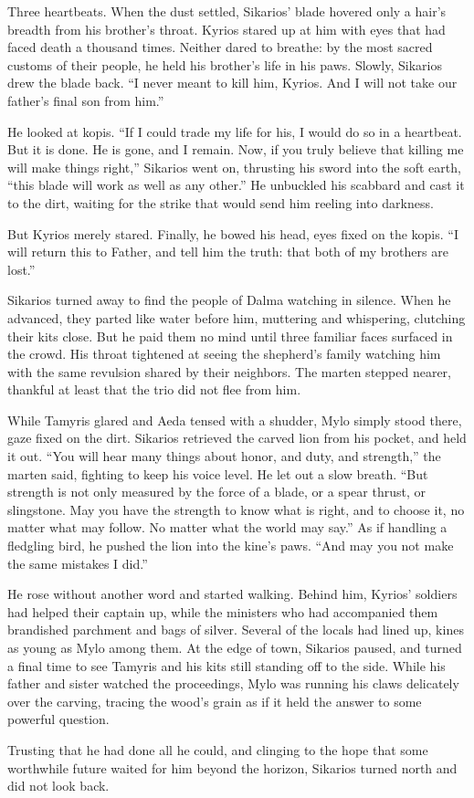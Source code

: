 Three heartbeats. When the dust settled, Sikarios' blade hovered only a hair's breadth from his brother's throat. Kyrios stared up at him with eyes that had faced death a thousand times. Neither dared to breathe: by the most sacred customs of their people, he held his brother's life in his paws. Slowly, Sikarios drew the blade back. ``I never meant to kill him, Kyrios. And I will not take our father's final son from him.''

He looked at kopis. ``If I could trade my life for his, I would do so in a heartbeat. But it is done. He is gone, and I remain. Now, if you truly believe that killing me will make things right,'' Sikarios went on, thrusting his sword into the soft earth, ``this blade will work as well as any other.'' He unbuckled his scabbard and cast it to the dirt, waiting for the strike that would send him reeling into darkness.

But Kyrios merely stared. Finally, he bowed his head, eyes fixed on the kopis. ``I will return this to Father, and tell him the truth: that both of my brothers are lost.''

Sikarios turned away to find the people of Dalma watching in silence. When he advanced, they parted like water before him, muttering and whispering, clutching their kits close. But he paid them no mind until three familiar faces surfaced in the crowd. His throat tightened at seeing the shepherd's family watching him with the same revulsion shared by their neighbors. The marten stepped nearer, thankful at least that the trio did not flee from him.

While Tamyris glared and Aeda tensed with a shudder, Mylo simply stood there, gaze fixed on the dirt. Sikarios retrieved the carved lion from his pocket, and held it out. ``You will hear many things about honor, and duty, and strength,'' the marten said, fighting to keep his voice level. He let out a slow breath. ``But strength is not only measured by the force of a blade, or a spear thrust, or slingstone. May you have the strength to know what is right, and to choose it, no matter what may follow. No matter what the world may say.'' As if handling a fledgling bird, he pushed the lion into the kine's paws. ``And may you not make the same mistakes I did.''

He rose without another word and started walking. Behind him, Kyrios' soldiers had helped their captain up, while the ministers who had accompanied them brandished parchment and bags of silver. Several of the locals had lined up, kines as young as Mylo among them. At the edge of town, Sikarios paused, and turned a final time to see Tamyris and his kits still standing off to the side. While his father and sister watched the proceedings, Mylo was running his claws delicately over the carving, tracing the wood's grain as if it held the answer to some powerful question.

Trusting that he had done all he could, and clinging to the hope that some worthwhile future waited for him beyond the horizon, Sikarios turned north and did not look back.
